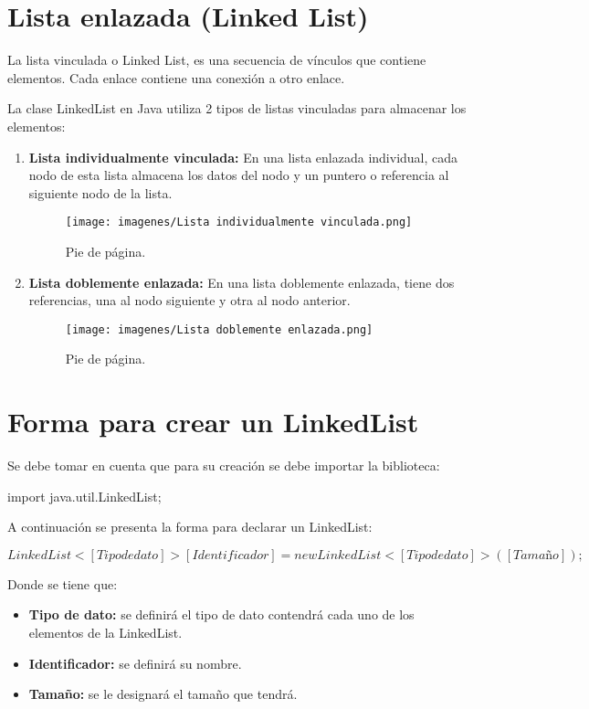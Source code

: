\documentclass[12pt, letterpaper]{article} %
\begin{document}
\section*{Lista enlazada (Linked List)}
La lista vinculada o Linked List, es una secuencia de vínculos que contiene elementos. Cada enlace contiene una conexión a otro enlace.

La clase LinkedList en Java utiliza 2 tipos de listas vinculadas para almacenar los elementos:
\begin{enumerate}
    \item \textbf{Lista individualmente vinculada:} En una lista enlazada individual, cada nodo de esta lista almacena los datos del nodo y un puntero o referencia al siguiente nodo de la lista.
    \begin{figure}[h]
        \centering
        \texttt{[image: imagenes/Lista individualmente vinculada.png]}
        \caption{Pie de página.}
        \label{fig:individual}
    \end{figure}

    \item \textbf{Lista doblemente enlazada:} En una lista doblemente enlazada, tiene dos referencias, una al nodo siguiente y otra al nodo anterior.
    \begin{figure}[h]
        \centering
        \texttt{[image: imagenes/Lista doblemente enlazada.png]}
        \caption{Pie de página.}
        \label{fig:doblemente}
    \end{figure}

\end{enumerate}

\section*{Forma para crear un LinkedList}
Se debe tomar en cuenta que para su creación se debe importar la biblioteca:

\begin{center}
    import java.util.LinkedList;
\end{center}
A continuación se presenta la forma para declarar un LinkedList:

\begin{center}
    $LinkedList<[Tipo de dato]> [Identificador] = new LinkedList<[Tipo de dato]>([Tamaño]);$
\end{center}
Donde se tiene que:
\begin{itemize}
    \item \textbf{Tipo de dato:} se definirá el tipo de dato contendrá cada uno de los elementos de la LinkedList.
    \item \textbf{Identificador:} se definirá su nombre.
    \item \textbf{Tamaño:} se le designará el tamaño que tendrá.
\end{itemize}
\end{document}
